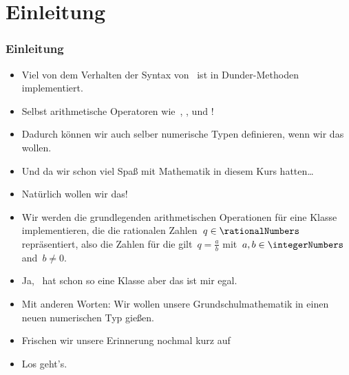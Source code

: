 \documentclass[aspectratio=169,mathserif,notheorems]{beamer}%
\subtitle{46.~Klassen/Dunder:~Arithmetische Operatoren und Vergleiche}%
\begin{document}
%
%
\startPresentation%
%
\section{Einleitung}%
\begin{frame}[t]%
\frametitle{Einleitung}%
\begin{itemize}%
%
\item Viel von dem Verhalten der Syntax von \python\ ist in Dunder-Methoden implementiert.%
%
\item<2-> Selbst arithmetische Operatoren wie~\pythonilIdx{+}, \pythonilIdx{-}, \pythonilIdx{*} und \pythonilIdx{/}!
%
\item<3-> Dadurch können wir auch \alert{selber} numerische Typen definieren, wenn wir das wollen.%
%
\item<4-> Und da wir schon viel Spaß mit Mathematik in diesem Kurs hatten\dots%
%
\item<5-> \alert{Natürlich wollen wir das!}%
%
\item<6-> Wir werden die grundlegenden arithmetischen Operationen für eine Klasse  implementieren, die die rationalen Zahlen~$q\in\rationalNumbers$ repräsentiert, also die Zahlen für die gilt~$q=\frac{a}{b}$ mit~$a,b\in\integerNumbers$ and~$b\neq0$.%
%
\item<7-> Ja, \python\ hat schon so eine Klasse aber das ist mir egal.%
%
\item<8-> Mit anderen Worten: Wir wollen unsere Grundschulmathematik in einen neuen numerischen Typ gießen.%
%
\item<9-> Frischen wir unsere Erinnerung nochmal kurz auf%
\item<12-> Los geht's.%
\end{itemize}%
\end{frame}%
%
\end{document}
